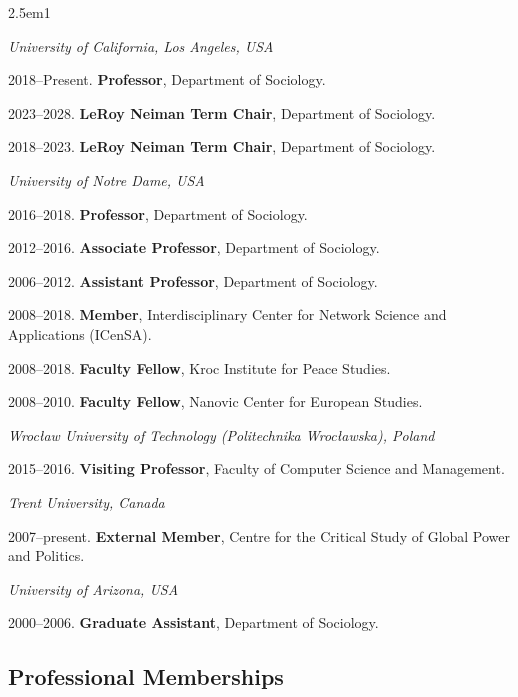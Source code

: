 \documentclass[
]{article}
\newenvironment{cventry}{\begin{hangparas}{2.5em}{1}}{\end{hangparas}}
\begin{document}
\begin{cventry}

\emph{University of California, Los Angeles, USA }

2018--Present. \textbf{Professor}, Department of Sociology.

2023--2028. \textbf{LeRoy Neiman Term Chair}, Department of Sociology.

2018--2023. \textbf{LeRoy Neiman Term Chair}, Department of Sociology.

\emph{University of Notre Dame, USA }

2016--2018. \textbf{Professor}, Department of Sociology.

2012--2016. \textbf{Associate Professor}, Department of Sociology.

2006--2012. \textbf{Assistant Professor}, Department of Sociology.

2008--2018. \textbf{Member}, Interdisciplinary Center for Network
Science and Applications (ICenSA).

2008--2018. \textbf{Faculty Fellow}, Kroc Institute for Peace Studies.

2008--2010. \textbf{Faculty Fellow}, Nanovic Center for European
Studies.

\emph{Wrocław University of Technology (Politechnika Wrocławska), Poland
}

2015--2016. \textbf{Visiting Professor}, Faculty of Computer Science and
Management.

\emph{Trent University, Canada }

2007--present. \textbf{External Member}, Centre for the Critical Study
of Global Power and Politics.

\emph{University of Arizona, USA }

2000--2006. \textbf{Graduate Assistant}, Department of Sociology.

\end{cventry}

\subsection{Professional Memberships}\label{professional-memberships}
\end{document}
